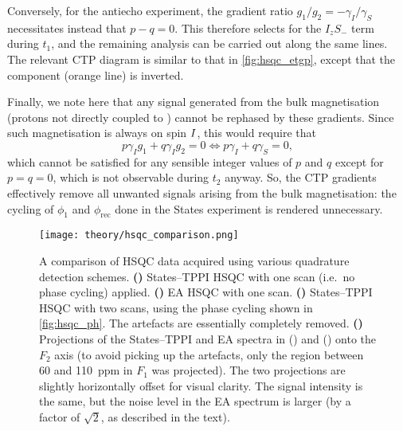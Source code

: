 Conversely, for the antiecho experiment, the gradient ratio $g_1/g_2 = -\gamma_I/\gamma_S$ necessitates instead that $p - q = 0$.
This therefore selects for the $I_zS_-$ term during $t_1$, and the remaining analysis can be carried out along the same lines.
The relevant CTP diagram is similar to that in \cref{fig:hsqc_etgp}, except that the \carbon{} component (orange line) is inverted.

Finally, we note here that any signal generated from the bulk magnetisation (protons not directly coupled to \carbon{}) cannot be rephased by these gradients.
Since such magnetisation is always on spin $I\/$, this would require that
\begin{equation}
    \label{eq:unrefocusable_bulk}
    p\gamma_I g_1 + q\gamma_I g_2 = 0 \Leftrightarrow p \gamma_I + q\gamma_S = 0,
\end{equation}
which cannot be satisfied for any sensible integer values of $p$ and $q$ except for $p = q = 0$, which is not observable during $t_2$ anyway.
So, the CTP gradients effectively remove all unwanted signals arising from the bulk magnetisation: the cycling of $\phi_1$ and $\phi_\text{rec}$ done in the States experiment is rendered unnecessary.

\begin{figure}[htbp]
    \centering
    \texttt{[image: theory/hsqc\_comparison.png]}%
    {\label{fig:hsqc_comparison_st_ns1}}%
    {\label{fig:hsqc_comparison_ea_ns1}}%
    {\label{fig:hsqc_comparison_st_ns2}}%
    {\label{fig:hsqc_comparison_projections}}%
    \caption[Experimental comparison of States--TPPI and echo--antiecho HSQC]{
        A comparison of HSQC data acquired using various quadrature detection schemes.
        \textbf{()} States--TPPI HSQC with one scan (i.e.\ no phase cycling) applied.
        \textbf{()} EA HSQC with one scan.
        \textbf{()} States--TPPI HSQC with two scans, using the phase cycling shown in \cref{fig:hsqc_ph}. The artefacts are essentially completely removed.
        \textbf{()} Projections of the States--TPPI and EA spectra in () and () onto the $F_2$ axis (to avoid picking up the artefacts, only the region between 60 and \qty{110}{ppm} in $F_1$ was projected).
        The two projections are slightly horizontally offset for visual clarity.
        The signal intensity is the same, but the noise level in the EA spectrum is larger (by a factor of $\sqrt{2}$, as described in the text).
    }
    \label{fig:hsqc_comparison}
\end{figure}

